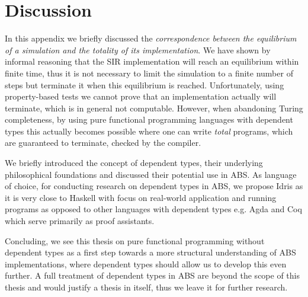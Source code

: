 

\section{Discussion}
In this appendix we briefly discussed the \textit{correspondence between the equilibrium of a simulation and the totality of its implementation}. We have shown by informal reasoning that the SIR implementation will reach an equilibrium within finite time, thus it is not necessary to limit the simulation to a finite number of steps but terminate it when this equilibrium is reached. Unfortunately, using property-based tests we cannot prove that an implementation actually will terminate, which is in general not computable. However, when abandoning Turing completeness, by using pure functional programming languages with dependent types this actually becomes possible where one can write \textit{total} programs, which are guaranteed to terminate, checked by the compiler.

We briefly introduced the concept of dependent types, their underlying philosophical foundations and discussed their potential use in ABS. As language of choice, for conducting research on dependent types in ABS, we propose Idris \cite{brady_idris_2013} as it is very close to Haskell with focus on real-world application and running programs as opposed to other languages with dependent types e.g. Agda and Coq which serve primarily as proof assistants.

Concluding, we see this thesis on pure functional programming without dependent types as a first step towards a more structural understanding of ABS implementations, where dependent types should allow us to develop this even further. A full treatment of dependent types in ABS are beyond the scope of this thesis and would justify a thesis in itself, thus we leave it for further research.